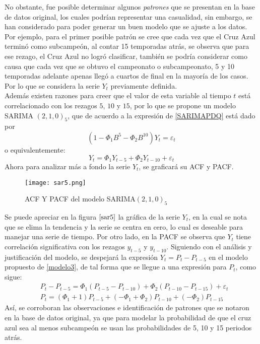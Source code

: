 \documentclass{article}
\theoremstyle{remark}
\begin{document}
No obstante, fue posible determinar algunos \textit{patrones} que se presentan en la base de datos original, los cuales podrían representar una casualidad, sin embargo, se han considerado para poder generar un buen modelo que se ajuste a los datos. Por ejemplo, para el primer posible patrón se cree que cada vez que el Cruz Azul terminó como subcampeón, al contar 15 temporadas atrás, se observa que para ese rezago, el Cruz Azul no logró clasificar, también se podría considerar como causa que cada vez que se obtuvo el campeonato o subcampeonato, 5 y 10 temporadas  adelante apenas llegó a cuartos de final en la mayoría de los casos. Por lo que se considera la serie $Y_t$ previamente definida. \\

Además existen razones para creer que el valor de esta variable al tiempo $t$ está correlacionado con los rezagos $5$, $10$ y $15$, por lo que se propone un modelo SARIMA $(2,1,0)_5$, que de acuerdo a la expresión de \eqref{SARIMAPDQ} está dado por 
\begin{equation*}
    (1 - \Phi_1B^5 - \Phi_2B^{10})Y_t =\varepsilon_t 
\end{equation*}
o equivalentemente:
\begin{equation}\label{modelo3}
    Y_t = \Phi_1Y_{t-5} + \Phi_2 Y_{t-10} + \varepsilon_t 
\end{equation}
Ahora para analizar más a fondo la serie $Y_t$, se graficará su ACF y PACF. 
\begin{figure}[H]
\centering
\texttt{[image: sar5.png]}
\caption{ACF Y PACF del modelo SARIMA$(2,1,0)_5$ }
\label{sar5}
\end{figure}

Se puede apreciar en la figura $\ref{sar5}$ la gráfica de la serie $Y_t$, en la cual se nota que se elima la tendencia y la serie se centra en cero, lo cual es deseable para manejar una serie de tiempo. Por otro lado, en la PACF se observa que $Y_t$ tiene correlación significativa con los rezagos $y_{t-5}$ y $y_{t-10}$. Siguiendo con el análisis y justificación del modelo, se despejará la expresión  $Y_t = P_t - P_{t-5}$ en el modelo propuesto de \eqref{modelo3}, de tal forma que se llegue a una expresión para $P_t$, como sigue: 
\begin{align*}
 & P_t - P_{t-5} =  \Phi_1(P_{t-5} - P_{t-10}) + \Phi_2 (P_{t-10} - P_{t-15}) + \varepsilon_t  \\
 & P_t = (\Phi_1 +1)P_{t-5} + (-\Phi_1 + \Phi_2)P_{t-10}  + (-\Phi_2) P_{t-15}
\end{align*}
Así, se corroboran las observaciones e identificación de patrones que se notaron en la base de datos original, ya que para modelar la probabilidad de que el cruz azul sea al menos subcampeón se usan las probabilidades de 5, 10 y 15 periodos atrás. \\
\end{document}

